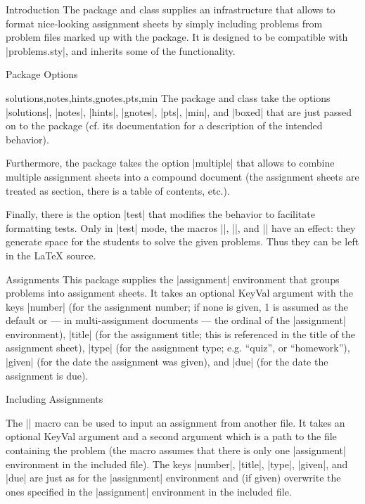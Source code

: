 \begin{sfragment}{Introduction}
The  package and class supplies an infrastructure that allows to format
nice-looking assignment sheets by simply including problems from problem files marked up
with the  package.  It is designed to be compatible with |problems.sty|, and
inherits some of the functionality.
\end{sfragment}

\begin{sfragment}{Package Options}
\begin{variable}{solutions,notes,hints,gnotes,pts,min}
  The  package and class take the options |solutions|, |notes|, |hints|,
  |gnotes|, |pts|, |min|, and |boxed| that are just passed on to the 
  package (cf. its documentation for a description of the intended behavior).
\end{variable}

Furthermore, the  package takes the option
|multiple| that allows to combine multiple assignment sheets
into a compound document (the assignment sheets are treated as section, there is a table
of contents, etc.).

Finally, there is the option |test| that modifies the behavior to
facilitate formatting tests. Only in |test| mode, the macros |\testspace|,
|\testnewpage|, and |\testemptypage| have an effect: they generate space for the
students to solve the given problems. Thus they can be left in the {\LaTeX} source. 
\end{sfragment}

\begin{sfragment}{Assignments}
This package supplies the |assignment| environment that groups
problems into assignment sheets. It takes an optional KeyVal argument with the keys
|number| (for the assignment number; if none is given, 1 is
assumed as the default or --- in multi-assignment documents --- the ordinal of the
|assignment| environment), |title| (for the assignment title; this
is referenced in the title of the assignment sheet), |type| (for the
assignment type; e.g. ``quiz'', or ``homework''), |given| (for the
date the assignment was given), and |due| (for the date the
assignment is due).
\end{sfragment}

\begin{sfragment}{Including Assignments}
\begin{function}{}
  The || macro can be used to input an assignment from another file. It
  takes an optional KeyVal argument and a second argument which is a path to the file
  containing the problem (the macro assumes that there is only one |assignment|
  environment in the included file).  The keys |number|, |title|, |type|, |given|, and
  |due| are just as for the |assignment| environment and (if given) overwrite the ones
  specified in the |assignment| environment in the included file.
\end{function}
\end{sfragment}

